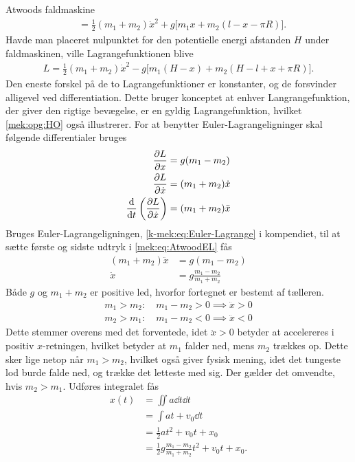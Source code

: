 \documentclass[crop=false, class=memoir]{standalone}
\begin{document}
\begin{opgave}[1]{Atwoods faldmaskine}
\begin{align*}
	&= \frac{1}{2}(m_1+m_2)\dot{x}^2 + g\Big[m_1x + m_2(l - x - \pi R)\Big].
\end{align*}
%
Havde man placeret nulpunktet for den potentielle energi afstanden $H$ under faldmaskinen, ville Lagrangefunktionen blive
%
\begin{align*}
	L = \frac{1}{2}(m_1+m_2)\dot{x}^2 - g\Big[m_1(H-x) + m_2(H - l + x + \pi R)\Big].
\end{align*}
%
Den eneste forskel på de to Lagrangefunktioner er konstanter, og de forsvinder alligevel ved differentiation. Dette bruger konceptet at enhver Langrangefunktion, der giver den rigtige bevægelse, er en gyldig Lagrangefunktion, hvilket \cref{mek:opg:HO} også illustrerer.
%
\opg For at benytter Euler-Lagrangeligninger skal følgende differentialer bruges
%
\begin{align} \label{mek:eq:AtwoodEL}
	\pdv{L}{x} &= g(m_1 - m_2) \\
	\pdv{L}{\dot{x}} &= (m_1 + m_2)\dot{x} \\
	\dv{}{t}\left(\pdv{L}{\dot{x}}\right) &= (m_1 + m_2)\ddot{x}
\end{align}
%
Bruges Euler-Lagrangeligningen, \cref{k-mek:eq:Euler-Lagrange} i kompendiet, til at sætte første og sidste udtryk i \cref{mek:eq:AtwoodEL} fås
%
\begin{align*}
	(m_1 + m_2)\ddot{x} &= g(m_1 - m_2) \\
	\ddot{x} &= g\frac{m_1 - m_2}{m_1 + m_2}
\end{align*}
%
\opg Både $g$ og $m_1+m_2$ er positive led, hvorfor fortegnet er bestemt af tælleren.
%
\begin{align*}
	m_1>m_2: \quad m_1-m_2>0 \implies \ddot{x}>0 \\
	m_2>m_1: \quad m_1-m_2<0 \implies \ddot{x}<0
\end{align*}
%
Dette stemmer overens med det forventede, idet $\ddot{x}>0$ betyder at accelereres i positiv $x$-retningen, hvilket betyder at $m_1$ falder ned, mens $m_2$ trækkes op. Dette sker lige netop når $m_1>m_2$, hvilket også giver fysisk mening, idet det tungeste lod burde falde ned, og trække det letteste med sig. Der gælder det omvendte, hvis $m_2>m_1$.
%
\opg Udføres integralet fås
%
\begin{align*}
	x(t) &= \iint a \dd{t} \dd{t} \\
	&= \int at + v_0 \dd{t} \\
	&= \frac{1}{2}at^2 + v_0t + x_0 \\
	&= \frac{1}{2}g\frac{m_1 - m_2}{m_1 + m_2}t^2 + v_0t + x_0.
\end{align*}
%
\end{opgave}
\end{document}
